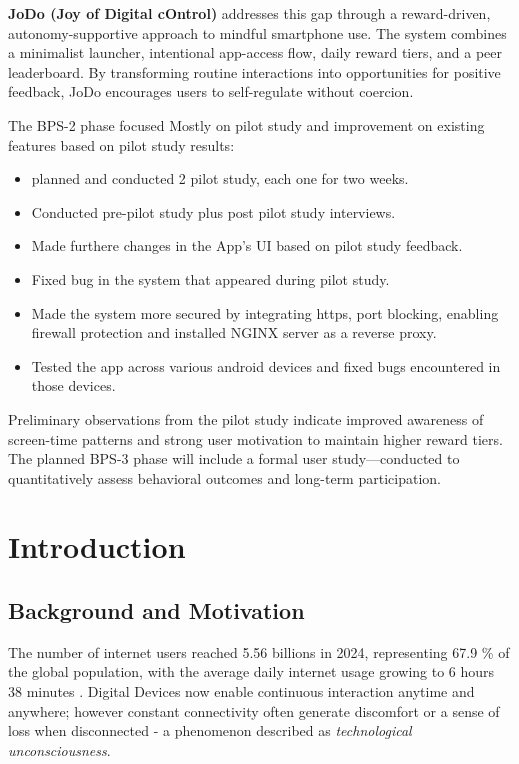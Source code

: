 \documentclass[12pt,a4paper]{report}
\begin{document}
\textbf{JoDo (Joy of Digital cOntrol)} addresses this gap through a reward-driven, autonomy-supportive approach to mindful smartphone use. The system combines a minimalist launcher, intentional app-access flow, daily reward tiers, and a peer leaderboard. By transforming routine interactions into opportunities for positive feedback, JoDo encourages users to self-regulate without coercion.

The BPS-2 phase focused Mostly on pilot study and improvement on existing features based on pilot study results:
\begin{itemize}
  \item planned and conducted 2 pilot study, each one for two weeks.
  \item Conducted pre-pilot study plus post pilot study interviews.
  \item Made furthere changes in the App's UI based on pilot study feedback.
  \item Fixed bug in the system that appeared during pilot study.
  \item Made the system more secured by integrating https, port blocking, enabling firewall protection and installed NGINX server as a reverse proxy.
  \item Tested the app across various android devices and fixed bugs encountered in those devices.
  
\end{itemize}

Preliminary observations from the pilot study indicate improved awareness of screen-time patterns and strong user motivation to maintain higher reward tiers.  
The planned BPS-3 phase will include a formal user study—conducted to quantitatively assess behavioral outcomes and long-term participation.



\newpage
\tableofcontents
\listoffigures
\listoftables

\newpage
\chapter{Introduction}
\section{Background and Motivation}
The number of internet users reached 5.56 billions in 2024, representing 67.9 \% of the global population, with the average daily internet usage growing to 6 hours 38 minutes \citep{datareportal2024digital}. Digital Devices now enable continuous interaction anytime and anywhere; however constant connectivity often generate discomfort or a sense of loss when disconnected - a phenomenon described as \textit{technological unconsciousness}. 
\end{document}
